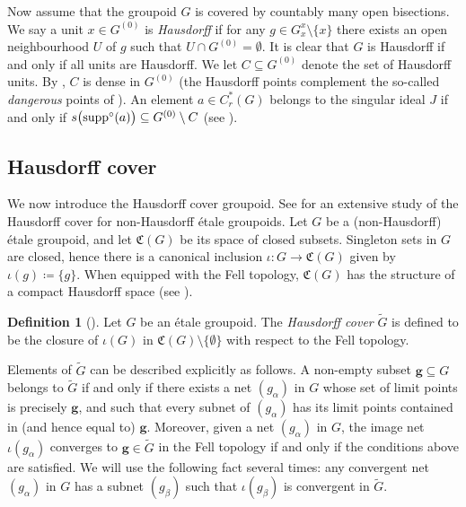 \documentclass[11pt, oneside, reqno]{amsart}
\newcommand{\Gu}{G^{(0)}}
\newcommand{\tiG}{\tilde{G}}
\newcommand{\supp}{{\rm supp}}
\newcommand{\osupp}{\supp^{\circ}}
\newcommand{\PRLsep}{\noindent\makebox[\linewidth]{\resizebox{0.3333\linewidth}{1pt}{$\bullet$}}\bigskip}
\theoremstyle{definition}
\newtheorem{dfn}[thm]{Definition}
\theoremstyle{remark}
\numberwithin{equation}{section}
\begin{document}
\vspace{0.3cm}
Now assume that the groupoid $G$ is covered by countably many open bisections. We say a unit $x \in \Gu$ is \emph{Hausdorff} if for any $g \in G_x^x \setminus \{x\}$ there exists an open neighbourhood $U$ of $g$ such that $U \cap \Gu = \emptyset$. It is clear that $G$ is Hausdorff if and only if all units are Hausdorff. We let $C \subseteq \Gu$ denote the set of Hausdorff units. By \cite[Lemma~7.15]{KM21}, $C$ is dense in $\Gu$ (the Hausdorff points complement the so-called \emph{dangerous} points of \cite{KM21}). An element $a \in C^*_r(G)$ belongs to the singular ideal $J$ if and only if $s\big(\osupp(a)\big) \subseteq \Gu \setminus C$ (see \cite[Proposition~7.18]{KM21}).

\PRLsep

\subsection{Hausdorff cover}\label{prelim:HffCover}

We now introduce the Hausdorff cover groupoid. See \cite{BGHL} for an extensive study of the Hausdorff cover for non-Hausdorff \'etale groupoids. Let $G$ be a (non-Hausdorff) {\'e}tale groupoid, and let $\mathfrak{C}(G)$ be its space of closed subsets. Singleton sets in $G$ are closed, hence there is a canonical inclusion $\iota \colon G \to \mathfrak{C}(G)$ given by $\iota(g) \coloneq \{g\}$. When equipped with the Fell topology, $\mathfrak{C}(G)$ has the structure of a compact Hausdorff space (see \cite{Fell}).

\begin{dfn}[\cite{Tim}]
Let $G$ be an {\'e}tale groupoid. The \emph{Hausdorff cover} $\tiG$ is defined to be the closure of $\iota(G)$ in $\mathfrak{C}(G) \setminus \{\emptyset\}$ with respect to the Fell topology.   
\end{dfn}

Elements of $\tiG$ can be described explicitly as follows. A non-empty subset $\bm{g} \subseteq G$ belongs to $\tiG$ if and only if there exists a net $(g_\alpha)$ in $G$ whose  set of limit points is precisely $\bm{g}$, and such that every subnet of $(g_\alpha)$ has its limit points contained in (and hence equal to) $\bm{g}$. Moreover, given a net $(g_\alpha)$ in $G$, the image net $\iota(g_\alpha)$ converges to $\bm{g} \in \tiG$ in the Fell topology if and only if the conditions above are satisfied. We will use the following fact several times: any convergent net $(g_\alpha)$ in $G$ has a subnet $(g_\beta)$ such that $\iota(g_\beta)$ is convergent in $\tiG$.
\end{document}
